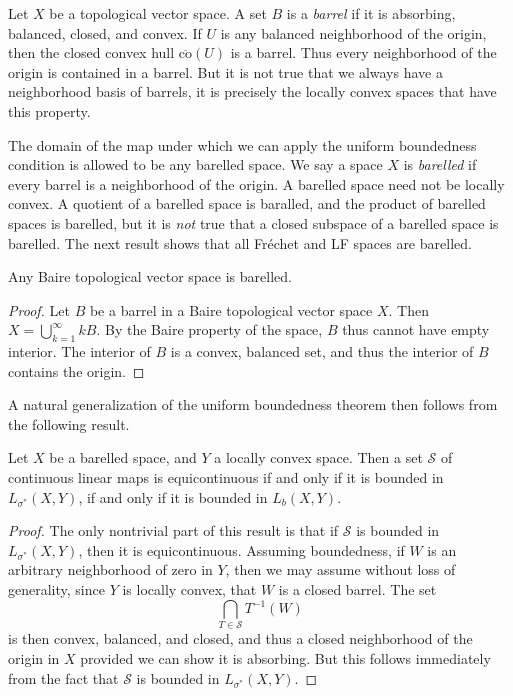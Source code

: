 Let $X$ be a topological vector space. A set $B$ is a \emph{barrel} if it is absorbing, balanced, closed, and convex. If $U$ is any balanced neighborhood of the origin, then the closed convex hull $\overline{\text{co}}(U)$ is a barrel. Thus every neighborhood of the origin is contained in a barrel. But it is not true that we always have a neighborhood basis of barrels, it is precisely the locally convex spaces that have this property.

The domain of the map under which we can apply the uniform boundedness condition is allowed to be any barelled space. We say a space $X$ is \emph{barelled} if every barrel is a neighborhood of the origin. A barelled space need not be locally convex. A quotient of a barelled space is baralled, and the product of barelled spaces is barelled, but it is \emph{not} true that a closed subspace of a barelled space is barelled. The next result shows that all Fr\'{e}chet and LF spaces are barelled.

\begin{theorem}
    Any Baire topological vector space is barelled.
\end{theorem}
\begin{proof}
    Let $B$ be a barrel in a Baire topological vector space $X$. Then $X = \bigcup_{k = 1}^\infty kB$. By the Baire property of the space, $B$ thus cannot have empty interior. The interior of $B$ is a convex, balanced set, and thus the interior of $B$ contains the origin.
\end{proof}

A natural generalization of the uniform boundedness theorem then follows from the following result.

\begin{theorem}
    Let $X$ be a barelled space, and $Y$ a locally convex space. Then a set $\mathcal{S}$ of continuous linear maps is equicontinuous if and only if it is bounded in $L_{\sigma^*}(X,Y)$, if and only if it is bounded in $L_b(X,Y)$.
\end{theorem}
\begin{proof}
    The only nontrivial part of this result is that if $\mathcal{S}$ is bounded in $L_{\sigma^*}(X,Y)$, then it is equicontinuous. Assuming boundedness, if $W$ is an arbitrary neighborhood of zero in $Y$, then we may assume without loss of generality, since $Y$ is locally convex, that $W$ is a closed barrel. The set
    \[ \bigcap_{T \in \mathcal{S}} T^{-1}(W) \]
    is then convex, balanced, and closed, and thus a closed neighborhood of the origin in $X$ provided we can show it is absorbing. But this follows immediately from the fact that $\mathcal{S}$ is bounded in $L_{\sigma^*}(X,Y)$.
\end{proof}

